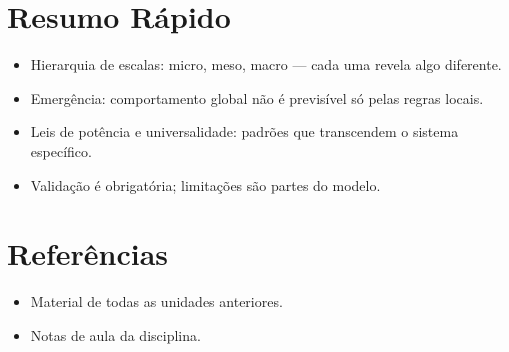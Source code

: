 \documentclass[12pt,a4paper]{article}
\begin{document}
\section*{Resumo R\'apido}
\begin{itemize}
  \item Hierarquia de escalas: micro, meso, macro --- cada uma revela algo diferente.
  \item Emerg\^encia: comportamento global n\~ao \'e previs\'ivel s\'o pelas regras locais.
  \item Leis de pot\^encia e universalidade: padr\~oes que transcendem o sistema espec\'ifico.
  \item Valida\c{c}\~ao \'e obrigat\'oria; limita\c{c}\~oes s\~ao partes do modelo.
\end{itemize}

\section*{Refer\^encias}
\begin{itemize}
  \item Material de todas as unidades anteriores.
  \item Notas de aula da disciplina.
\end{itemize}
\end{document}

